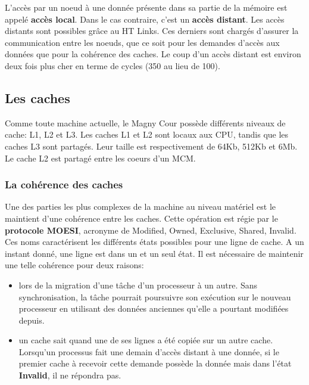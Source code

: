       L'accès par un noeud à une donnée présente dans sa partie de la mémoire
      est appelé \textbf{accès local}. Dans le cas contraire, c'est un
      \textbf{accès distant}. Les accès distants sont possibles grâce au HT
      Links. Ces derniers sont chargés d'assurer la communication entre les
      noeuds, que ce soit pour les demandes d'accès aux données que pour la
      cohérence des caches. Le coup d'un accès distant est environ deux fois
      plus cher en terme de cycles (350 au lieu de 100).

    \subsection{Les caches}

      Comme toute machine actuelle, le Magny Cour possède différents niveaux de
      cache: L1, L2 et L3. Les caches L1 et L2 sont locaux aux CPU, tandis que
      les caches L3 sont partagés. Leur taille est respectivement de 64Kb, 512Kb
      et 6Mb. Le cache L2 est partagé entre les coeurs d'un MCM.

      \subsubsection{La cohérence des caches}

        Une des parties les plus complexes de la machine au niveau matériel est
        le maintient d'une cohérence entre les caches. Cette opération est régie
        par le \textbf{protocole MOESI}, acronyme de Modified, Owned, Exclusive,
        Shared, Invalid. Ces noms caractérisent les différents états possibles
        pour une ligne de cache. A un instant donné, une ligne est dans un et un
        seul état\cite{AMD_dev_2}. Il est nécessaire de maintenir une telle
        cohérence pour deux raisons:

        \begin{itemize}
          \item lors de la migration d’une tâche d’un processeur à un
            autre. Sans synchronisation, la tâche pourrait poursuivre son
            exécution sur le nouveau processeur en utilisant des données
            anciennes qu’elle a pourtant modifiées depuis.
          \item un cache sait quand une de ses lignes a été copiée sur un autre
            cache. Lorsqu'un processus fait une demain d'accès distant à une
            donnée, si le premier cache à recevoir cette demande possède la
            donnée mais dans l'état \textbf{Invalid}, il ne répondra pas.
        \end{itemize}

